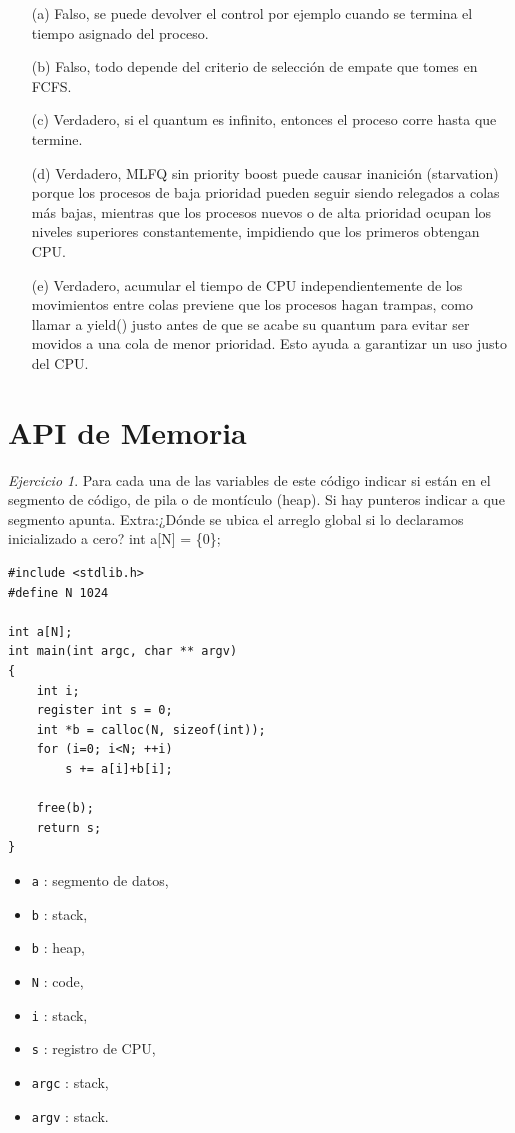 \documentclass[12pt]{article}
\begin{document}
\begin{rta}
    \begin{itemize}
        \item[(a)] Falso, se puede devolver el control por ejemplo cuando se termina el tiempo asignado del proceso.
        \item[(b)] Falso, todo depende del criterio de selección de empate que tomes en FCFS.
        \item[(c)] Verdadero, si el quantum es infinito, entonces el proceso corre hasta que termine.
        \item[(d)] Verdadero, MLFQ sin priority boost puede causar inanición (starvation) porque los procesos de baja prioridad pueden seguir siendo relegados a colas más bajas, mientras que los procesos nuevos o de alta prioridad ocupan los niveles superiores constantemente, impidiendo que los primeros obtengan CPU. 
        \item[(e)] Verdadero, acumular el tiempo de CPU independientemente de los movimientos entre colas previene que los procesos hagan trampas, como llamar a yield() justo antes de que se acabe su quantum para evitar ser movidos a una cola de menor prioridad. Esto ayuda a garantizar un uso justo del CPU.
    \end{itemize}
\end{rta}

\section*{API de Memoria}

\noindent \textit{Ejercicio 1}. Para cada una de las variables de este código indicar si están en el segmento de código,  de pila o de montículo (heap). Si hay punteros indicar a que segmento apunta. \newline
Extra:¿Dónde se ubica el arreglo global si lo declaramos inicializado a cero? int a[N] = \{0\};
\begin{lstlisting}[style=CStyle]
#include <stdlib.h>
#define N 1024

int a[N];
int main(int argc, char ** argv)
{
    int i;
    register int s = 0;
    int *b = calloc(N, sizeof(int));
    for (i=0; i<N; ++i)
        s += a[i]+b[i];
    
    free(b);
    return s;
}    
\end{lstlisting}

\begin{rta}
    \begin{itemize}
        \item \texttt{a} : segmento de datos,
        \item \texttt{b} : stack,
        \item \texttt{\*b} : heap,
        \item \texttt{N} : code,
        \item \texttt{i} : stack,
        \item \texttt{s} : registro de CPU,
        \item \texttt{argc} : stack,
        \item \texttt{argv} : stack.
    \end{itemize}
\end{rta}
\end{document}
